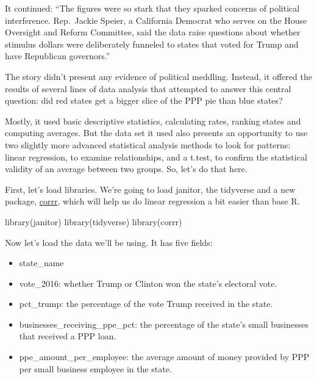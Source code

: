 \documentclass[
  letterpaper,
  DIV=11,
  numbers=noendperiod]{scrreprt}
\newenvironment{Shaded}{\begin{snugshade}}{\end{snugshade}}
\newcommand{\FunctionTok}[1]{\textcolor[rgb]{0.28,0.35,0.67}{#1}}
\newcommand{\NormalTok}[1]{\textcolor[rgb]{0.00,0.23,0.31}{#1}}
\providecommand{\tightlist}{%
  \setlength{\itemsep}{0pt}\setlength{\parskip}{0pt}}\usepackage{longtable,booktabs,array}
\begin{document}
It continued: ``The figures were so stark that they sparked concerns of
political interference. Rep.~Jackie Speier, a California Democrat who
serves on the House Oversight and Reform Committee, said the data raise
questions about whether stimulus dollars were deliberately funneled to
states that voted for Trump and have Republican governors.''

The story didn't present any evidence of political meddling. Instead, it
offered the results of several lines of data analysis that attempted to
answer this central question: did red states get a bigger slice of the
PPP pie than blue states?

Mostly, it used basic descriptive statistics, calculating rates, ranking
states and computing averages. But the data set it used also presents an
opportunity to use two slightly more advanced statistical analysis
methods to look for patterns: linear regression, to examine
relationships, and a t.test, to confirm the statistical validity of an
average between two groups. So, let's do that here.

First, let's load libraries. We're going to load janitor, the tidyverse
and a new package, \href{https://corrr.tidymodels.org/}{corrr}, which
will help us do linear regression a bit easier than base R.

\begin{Shaded}
\begin{Highlighting}[]
\FunctionTok{library}\NormalTok{(janitor)}
\FunctionTok{library}\NormalTok{(tidyverse)}
\FunctionTok{library}\NormalTok{(corrr)}
\end{Highlighting}
\end{Shaded}

Now let's load the data we'll be using. It has five fields:

\begin{itemize}
\tightlist
\item
  state\_name
\item
  vote\_2016: whether Trump or Clinton won the state's electoral vote.
\item
  pct\_trump: the percentage of the vote Trump received in the state.
\item
  businesses\_receiving\_ppe\_pct: the percentage of the state's small
  businesses that received a PPP loan.
\item
  ppe\_amount\_per\_employee: the average amount of money provided by
  PPP per small business employee in the state.
\end{itemize}
\end{document}
